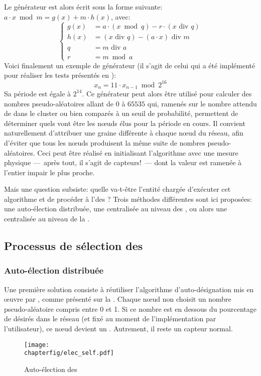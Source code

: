 Le générateur est alors écrit sous la forme suivante: $a\cdot x\bmod m=g(x)+m\cdot h(x)$, avec:
\[\left\{
    \begin{aligned}
        g(x) & =a\cdot(x\bmod q)-r\cdot(x\mbox{~div~}q)\\
        h(x) & =(x\mbox{~div~}q)-(a\cdot x)\mbox{~div~}m\\
        q    & =m\mbox{~div~}a\\
        r    & =m\bmod a
    \end{aligned}
\right.\]
Voici finalement un exemple de générateur (il s'agit de celui qui a été implémenté pour réaliser les tests présentés en ):
\[x_n=11\cdot x_{n-1}\bmod2^{16}\]
Sa période est égale à $2^{14}$.
Ce générateur peut alors être utilisé pour calculer des nombres pseudo-aléatoires allant de $0$ à $65535$ qui, ramenés sur le nombre attendu de \cns dans le cluster ou bien comparés à un seuil de probabilité, permettent de déterminer quels vont être les nœuds élus pour la période en cours.
Il convient naturellement d'attribuer une graine différente à chaque nœud du réseau, afin d'éviter que tous les nœuds produisent la même suite de nombres pseudo-aléatoires.
Ceci peut être réalisé en initialisant l'algorithme avec une mesure physique ---~après tout, il s'agit de capteurs!~--- dont la valeur est ramenée à l'entier impair le plus proche.

Mais une question subsiste: quelle va-t-être l'entité chargée d'exécuter cet algorithme et de procéder à l'\election des \cns?
Trois méthodes différentes sont ici proposées: une auto-élection distribuée, une \election centralisée au niveau des \CH, ou alors une \election centralisée au niveau de la \sdb.
    \subsection{Processus de sélection des \cns}

        \subsubsection{Auto-élection distribuée}
Une première solution consiste à réutiliser l'algorithme d'auto-désignation mis en œuvre par \leach, comme présenté sur la .
Chaque nœud non \CH choisit un nombre pseudo-aléatoire compris entre 0 et 1.
Si ce nombre est en dessous du pourcentage de \cns désirés dans le réseau (et fixé au moment de l'implémentation par l'utilisateur), ce nœud devient un \cn.
Autrement, il reste un capteur normal.
\begin{figure}[ht]
    \centering
    \texttt{[image: \\chapterfig/elec\_self.pdf]}
    \caption{Auto-élection des \cns}\label{sa:fig:elecself}
\end{figure}

